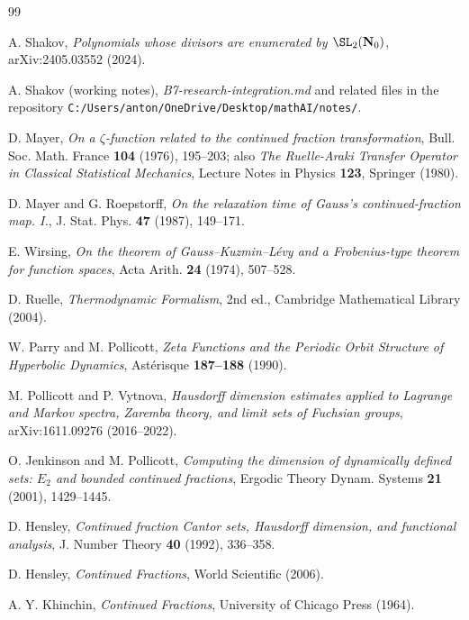 ﻿\documentclass[11pt]{article}
\theoremstyle{definition}
\newcommand{\N}{\mathbf{N}}
\begin{document}
\begin{thebibliography}{99}

A. Shakov, \emph{Polynomials whose divisors are enumerated by $\SL_2(\N_0)$}, arXiv:2405.03552 (2024).

A. Shakov (working notes), \emph{B7-research-integration.md} and related files in the repository \texttt{C:/Users/anton/OneDrive/Desktop/mathAI/notes/}.

D. Mayer, \emph{On a $\zeta$-function related to the continued fraction transformation}, Bull. Soc. Math. France \textbf{104} (1976), 195--203; also \emph{The Ruelle-Araki Transfer Operator in Classical Statistical Mechanics}, Lecture Notes in Physics \textbf{123}, Springer (1980).

D. Mayer and G. Roepstorff, \emph{On the relaxation time of Gauss's continued-fraction map. I.}, J. Stat. Phys. \textbf{47} (1987), 149--171.

E. Wirsing, \emph{On the theorem of Gauss--Kuzmin--L\'evy and a Frobenius-type theorem for function spaces}, Acta Arith. \textbf{24} (1974), 507--528.

D. Ruelle, \emph{Thermodynamic Formalism}, 2nd ed., Cambridge Mathematical Library (2004).

W. Parry and M. Pollicott, \emph{Zeta Functions and the Periodic Orbit Structure of Hyperbolic Dynamics}, Ast\'erisque \textbf{187--188} (1990).

M. Pollicott and P. Vytnova, \emph{Hausdorff dimension estimates applied to Lagrange and Markov spectra, Zaremba theory, and limit sets of Fuchsian groups}, arXiv:1611.09276 (2016--2022).

O. Jenkinson and M. Pollicott, \emph{Computing the dimension of dynamically defined sets: $E_2$ and bounded continued fractions}, Ergodic Theory Dynam. Systems \textbf{21} (2001), 1429--1445.

D. Hensley, \emph{Continued fraction Cantor sets, Hausdorff dimension, and functional analysis}, J. Number Theory \textbf{40} (1992), 336--358.

D. Hensley, \emph{Continued Fractions}, World Scientific (2006).

A. Y. Khinchin, \emph{Continued Fractions}, University of Chicago Press (1964).


\end{thebibliography}
\end{document}
